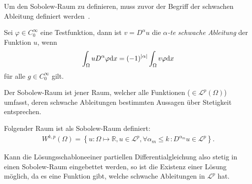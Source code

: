 Um den Sobolew-Raum zu definieren, muss zuvor der Begriff der schwachen Ableitung definiert werden~\cite[nach][S. 13f.]{korobkov_steady_2024}.
\begin{Definition}
    Sei $\varphi\in C^{\infty}_0$ eine Testfunktion, dann ist $v=D^{\alpha} u$ die \emph{$\alpha$-te schwache Ableitung} der Funktion $u$, wenn
    \begin{align*}
        \int_{\Omega}{uD^{\alpha}\varphi \text{d}{x}}=(-1)^{|\alpha|} \int_{\Omega}{v\varphi \text{d} x}
    \end{align*}
    für alle $g\in C^{\infty}_0$ gilt.
\end{Definition}
Der Sobolew-Raum ist jener Raum, welcher alle Funktionen ($\in \mathcal{L}^p (\Omega)$) umfasst, deren schwache Ableitungen bestimmten Aussagen über Stetigkeit entsprechen.
\begin{Definition}
    Folgender Raum ist als Sobolew-Raum definiert:
    \begin{align*}
    W^{k,p}(\Omega) = \left\{ u:\Omega \mapsto \mathbb{R}, u \in \mathcal{L}^p , \forall \alpha_m \leq k \,: D^{\alpha_m}u \in \mathcal{L}^p \right\}.
    \end{align*}
\end{Definition}
Kann die \glqq Lösungsschablone\grqq einer partiellen Differentialgleichung also stetig in einen Sobolew-Raum eingebettet werden, so ist die Existenz einer Lösung möglich, da es eine Funktion gibt, welche schwache Ableitungen in $\mathcal{L}^p$ hat.

